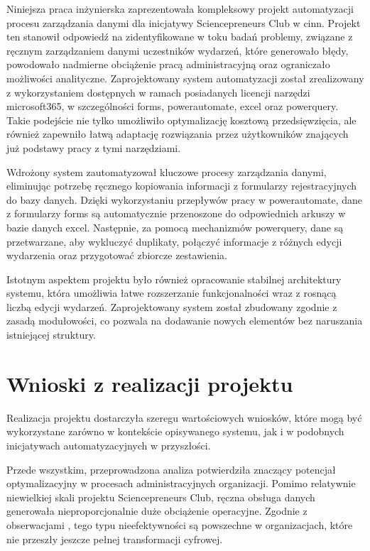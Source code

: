 Niniejsza praca inżynierska zaprezentowała kompleksowy projekt automatyzacji procesu zarządzania danymi dla inicjatywy Sciencepreneurs Club w \gls{cinn}. Projekt ten stanowił odpowiedź na zidentyfikowane w toku badań problemy, związane z ręcznym zarządzaniem danymi uczestników wydarzeń, które generowało błędy, powodowało nadmierne obciążenie pracą administracyjną oraz ograniczało możliwości analityczne.
Zaprojektowany system automatyzacji został zrealizowany z wykorzystaniem dostępnych w ramach posiadanych licencji narzędzi \gls{microsoft365}, w szczególności \gls{forms}, \gls{powerautomate}, \gls{excel} oraz \gls{powerquery}. Takie podejście nie tylko umożliwiło optymalizację kosztową przedsięwzięcia, ale również zapewniło łatwą adaptację rozwiązania przez użytkowników znających już podstawy pracy z tymi narzędziami.

Wdrożony system zautomatyzował kluczowe procesy zarządzania danymi, eliminując potrzebę ręcznego kopiowania informacji z formularzy rejestracyjnych do bazy danych. Dzięki wykorzystaniu przepływów pracy w \gls{powerautomate}, dane z formularzy \gls{forms} są automatycznie przenoszone do odpowiednich arkuszy w bazie danych \gls{excel}. Następnie, za pomocą mechanizmów \gls{powerquery}, dane są przetwarzane, aby wykluczyć duplikaty, połączyć informacje z różnych edycji wydarzenia oraz przygotować zbiorcze zestawienia.

Istotnym aspektem projektu było również opracowanie stabilnej architektury systemu, która umożliwia łatwe rozszerzanie funkcjonalności wraz z rosnącą liczbą edycji wydarzeń. Zaprojektowany system został zbudowany zgodnie z zasadą modułowości, co pozwala na dodawanie nowych elementów bez naruszania istniejącej struktury.

\section{Wnioski z realizacji projektu}
Realizacja projektu dostarczyła szeregu wartościowych wniosków, które mogą być wykorzystane zarówno w kontekście opisywanego systemu, jak i w podobnych inicjatywach automatyzacyjnych w przyszłości.

Przede wszystkim, przeprowadzona analiza potwierdziła znaczący potencjał optymalizacyjny w procesach administracyjnych organizacji. Pomimo relatywnie niewielkiej skali projektu Sciencepreneurs Club, ręczna obsługa danych generowała nieproporcjonalnie duże obciążenie operacyjne. Zgodnie z obserwacjami \cite{gontar2019}, tego typu nieefektywności są powszechne w organizacjach, które nie przeszły jeszcze pełnej transformacji cyfrowej.

